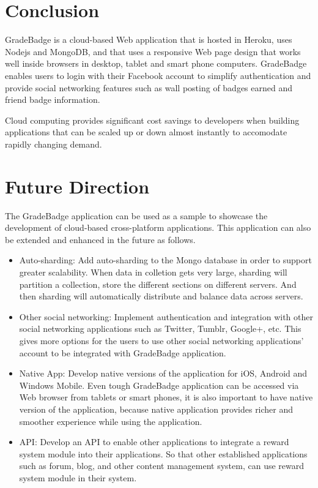 
\section{Conclusion}

GradeBadge is a cloud-based Web application that is hosted in Heroku, uses Nodejs and MongoDB, and that uses a responsive Web page design that works well inside browsers in desktop, tablet and smart phone computers. GradeBadge enables users to login with their Facebook account to simplify authentication and provide social networking features such as wall posting of badges earned and friend badge information. 

Cloud computing provides significant cost savings to developers when building applications that can be scaled up or down almost instantly to accomodate rapidly changing demand.

\section{Future Direction}

The GradeBadge application can be used as a sample to showcase the development of cloud-based cross-platform applications. This application can also be extended and enhanced in the future as follows. 

\begin{itemize}
\item Auto-sharding: Add auto-sharding to the Mongo database in order to support greater scalability. When data in colletion gets very large, sharding will partition a collection, store the different sections on different servers. And then sharding will automatically distribute and balance data across servers.  
\item Other social networking: Implement authentication and integration with other social networking applications such as Twitter, Tumblr, Google+,  etc. This gives more options for the users to use other social networking applications' account to be integrated with GradeBadge application.  
\item Native App: Develop native versions of the application for iOS, Android and Windows Mobile. Even tough GradeBadge application can be accessed via Web browser from tablets or smart phones, it is also important to have native version of the application, because native application provides richer and smoother experience while using the application.   
\item API: Develop an API to enable other applications to integrate a reward system module into their applications. So that other established applications such as forum, blog, and other content management system, can use reward system module in their system.      
\end{itemize}

